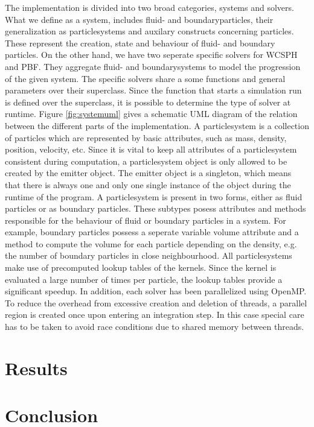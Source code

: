\documentclass[11pt, letterpaper, twocolumn]{article}
\begin{document}
The implementation is divided into two broad categories, systems and solvers.
What we define as a system, includes fluid- and boundaryparticles, their generalization as particlesystems and auxilary constructs concerning particles. These represent the creation, state and behaviour of fluid- and boundary particles.
On the other hand, we have two seperate specific solvers for WCSPH and PBF. They aggregate fluid- and boundarysystems to model the progression of the given system. The specific solvers share a some functions and general parameters over their superclass. Since the function that starts a simulation run is defined over the superclass, it is possible to determine the type of solver at runtime.
Figure \ref{fig:systemuml} gives a schematic UML diagram of the relation between the different parts of the implementation.
A particlesystem is a collection of particles which are represented by basic attributes, such as mass, density, position, velocity, etc. Since it is vital to keep all attributes of a particlesystem consistent during computation, a particlesystem object is only allowed to be created by the emitter object. The emitter object is a singleton, which means that there is always one and only one single instance of the object during the runtime of the program. A particlesystem is present in two forms, either as fluid particles or as boundary particles. These subtypes posess attributes and methods responsible for the behaviour of fluid or boundary particles in a system. For example, boundary particles possess a seperate variable volume attribute and a method to compute the volume for each particle depending on the density, e.g. the number of boundary particles in close neighbourhood. All particlesystems make use of precomputed lookup tables of the kernels. Since the kernel is evaluated a large number of times per particle, the lookup tables provide a significant speedup.
In addition, each solver has been parallelized using OpenMP. To reduce the overhead from excessive creation and deletion of threads, a parallel region is created once upon entering an integration step. In this case special care has to be taken to avoid race conditions due to shared memory between threads. 

\section*{Results}
\label{sec:results}


\section*{Conclusion}
\label{sec:conclusion}
\end{document}
